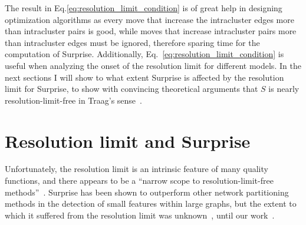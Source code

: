 
The result in Eq.\ref{eq:resolution_limit_condition} is of great help in designing optimization algorithms as every move that increase the intracluster edges more than intracluster pairs is good, while moves that increase intracluster pairs more than intracluster edges must be ignored, therefore sparing time for the computation of Surprise. Additionally, Eq.~\ref{eq:resolution_limit_condition} is useful when analyzing the onset of the resolution limit for different models.
In the next sections I will show to what extent Surprise is affected by the resolution limit for Surprise, to show with convincing theoretical arguments that $S$ is nearly resolution-limit-free in Traag's sense~\cite{traag2015}.

\section{Resolution limit and Surprise}
Unfortunately, the resolution limit is an intrinsic feature of many quality functions, and there appears to be a ``narrow scope to resolution-limit-free methods''~\cite{traag2015}.
Surprise has been shown to outperform other network partitioning methods in the detection of small features within large graphs, but the extent to which it suffered from the resolution limit was unknown~\cite{aldecoa2011,aldecoa2013}, until our work~\cite{nicolini2016}.

